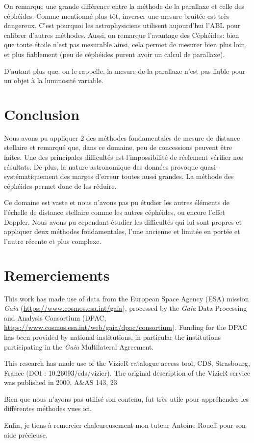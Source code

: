 \documentclass[12pt,a4paper,french]{scrartcl}
\begin{document}
On remarque une grande différence entre la méthode de la parallaxe et celle des céphéides.
Comme mentionné plus tôt, inverser une mesure bruitée est très dangereux.
C'est pourquoi les astrophysiciens utilisent aujourd'hui l'ABL pour calibrer d'autres méthodes.
Aussi, on remarque l'avantage des Céphéides: bien que toute étoile n'est pas mesurable ainsi, 
cela permet de mesurer bien plus loin, et plus fiablement (peu de céphéides purent avoir un calcul de parallaxe).

D'autant plus que, on le rappelle, la mesure de la parallaxe n'est pas fiable pour un objet à la luminosité variable.

\section{Conclusion}
Nous avons pu appliquer 2 des méthodes fondamentales de mesure de distance stellaire et remarqué que, dans ce domaine,
peu de concessions peuvent être faites. Une des principales difficultés est l'impossibilité de réelement vérifier nos résultats.
De plus, la nature astronomique des données provoque quasi-systématiquement des marges d'erreur toutes aussi grandes. 
La méthode des céphéides permet donc de les réduire.

Ce domaine est vaste et nous n'avons pas pu étudier les autres éléments de l'échelle de distance stellaire
comme les autres céphéides, ou encore l'effet Doppler. Nous avons pu cependant étudier les difficultés qui lui sont propres 
et appliquer deux méthodes fondamentales, l'une ancienne et limitée en portée et l'autre récente et plus complexe.

\section*{Remerciements}

This work has made use of data from the European Space Agency (ESA) mission
{\itshape Gaia} (\url{https://www.cosmos.esa.int/gaia}), processed by the {\itshape Gaia}
Data Processing and Analysis Consortium (DPAC,
\url{https://www.cosmos.esa.int/web/gaia/dpac/consortium}). Funding for the DPAC
has been provided by national institutions, in particular the institutions
participating in the {\itshape Gaia} Multilateral Agreement.

This research has made use of the VizieR catalogue access tool, CDS,
Strasbourg, France (DOI : 10.26093/cds/vizier). The original description 
of the VizieR service was published in 2000, A\&AS 143, 23

Bien que nous n'ayons pas utilisé son contenu, \citet{main-source} fut très utile pour appréhender les différentes méthodes vues ici.

Enfin, je tiens à remercier chaleureusement mon tuteur Antoine Roueff pour son aide précieuse.




\end{document}

